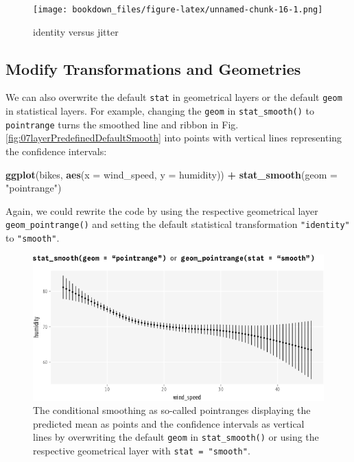 \documentclass[
]{krantz}
\makeatletter
\newenvironment{Shaded}{\begin{snugshade}}{\end{snugshade}}
\newcommand{\AttributeTok}[1]{\textcolor[rgb]{0.27,0.27,0.27}{#1}}
\newcommand{\FunctionTok}[1]{\textcolor[rgb]{0.27,0.27,0.27}{\textbf{#1}}}
\newcommand{\NormalTok}[1]{#1}
\newcommand{\SpecialCharTok}[1]{\textcolor[rgb]{0.43,0.43,0.43}{\textbf{#1}}}
\newcommand{\StringTok}[1]{\textcolor[rgb]{0.5,0.5,0.5}{#1}}
\newenvironment{kframe}{%
\medskip{}
\setlength{\fboxsep}{.8em}
 \def\at@end@of@kframe{}%
 \ifinner\ifhmode%
  \def\at@end@of@kframe{\end{minipage}}%
  \begin{minipage}{\columnwidth}%
 \fi\fi%
 \def\FrameCommand##1{\hskip\@totalleftmargin \hskip-\fboxsep
 \colorbox{shadecolor}{##1}\hskip-\fboxsep
     \hskip-\linewidth \hskip-\@totalleftmargin \hskip\columnwidth}%
 \MakeFramed {\advance\hsize-\width
   \@totalleftmargin\z@ \linewidth\hsize
   \@setminipage}}%
 {\par\unskip\endMakeFramed%
 \at@end@of@kframe}
\renewenvironment{Shaded}{\begin{kframe}}{\end{kframe}}
\makeatother
\begin{document}
\begin{figure}
\centering
\texttt{[image: bookdown\_files/figure-latex/unnamed-chunk-16-1.png]}
\caption{\label{fig:unnamed-chunk-16}identity versus jitter}
\end{figure}

\hypertarget{modify-transformations-and-geometries}{%
\subsection{Modify Transformations and Geometries}\label{modify-transformations-and-geometries}}

We can also overwrite the default \texttt{stat} in geometrical layers or the default \texttt{geom} in statistical layers. For example, changing the \texttt{geom} in \texttt{stat\_smooth()} to \texttt{pointrange} turns the smoothed line and ribbon in Fig. \ref{fig:07layerPredefinedDefaultSmooth} into points with vertical lines representing the confidence intervals:

\begin{Shaded}
\begin{Highlighting}[]
\FunctionTok{ggplot}\NormalTok{(bikes, }\FunctionTok{aes}\NormalTok{(}\AttributeTok{x =}\NormalTok{ wind\_speed, }\AttributeTok{y =}\NormalTok{ humidity)) }\SpecialCharTok{+}
  \FunctionTok{stat\_smooth}\NormalTok{(}\AttributeTok{geom =} \StringTok{"pointrange"}\NormalTok{)}
\end{Highlighting}
\end{Shaded}

Again, we could rewrite the code by using the respective geometrical layer \texttt{geom\_pointrange()} and setting the default statistical transformation \texttt{"identity"} to \texttt{"smooth"}.

\begin{figure}
\centering
\includegraphics{bookdown_files/figure-latex/07layerPredefinedCustomSmooth-1.png}
\caption{\label{fig:07layerPredefinedCustomSmooth}The conditional smoothing as so-called pointranges displaying the predicted mean as points and the confidence intervals as vertical lines by overwriting the default \texttt{geom} in \texttt{stat\_smooth()} or using the respective geometrical layer with \texttt{stat\ =\ "smooth"}.}
\end{figure}
\end{document}
